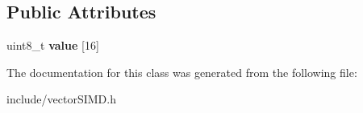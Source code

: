 \subsection*{Public Attributes}
\begin{DoxyCompactItemize}
\item 
uint8\+\_\+t {\bfseries value} \mbox{[}16\mbox{]}\hypertarget{classirr_1_1core_1_1vectorSIMDBool_a5e7d9a13b8d67e9495a6e0b87b12d675}{}\label{classirr_1_1core_1_1vectorSIMDBool_a5e7d9a13b8d67e9495a6e0b87b12d675}

\end{DoxyCompactItemize}


The documentation for this class was generated from the following file\+:\begin{DoxyCompactItemize}
\item 
include/vector\+S\+I\+M\+D.\+h\end{DoxyCompactItemize}
